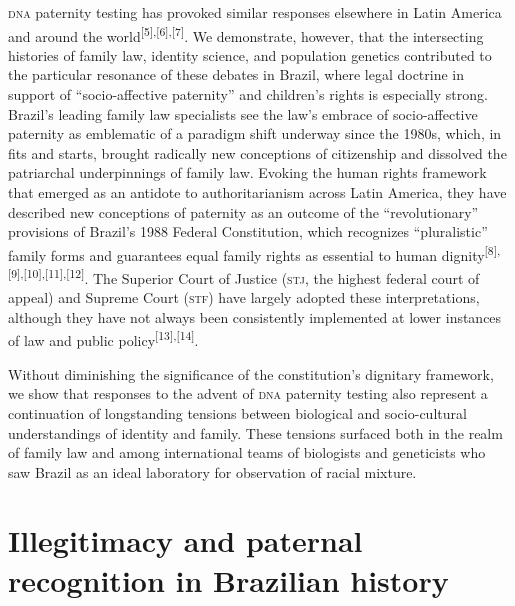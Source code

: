 \documentclass{article}
\begin{document}
\textsc{dna} paternity testing has provoked similar responses elsewhere in Latin America
and around the world\textsuperscript{[}\textsuperscript{5}\textsuperscript{]}\textsuperscript{,}\textsuperscript{[}\textsuperscript{6}\textsuperscript{]}\textsuperscript{,}\textsuperscript{[}\textsuperscript{7}\textsuperscript{]}. We demonstrate, however, that the intersecting histories of family law,
identity science, and population genetics contributed to the particular
resonance of these debates in Brazil, where legal doctrine in support of
“socio-affective paternity” and children’s rights is especially strong. Brazil’s
leading family law specialists see the law’s embrace of socio-affective
paternity as emblematic of a paradigm shift underway since the 1980s, which, in
fits and starts, brought radically new conceptions of citizenship and dissolved
the patriarchal underpinnings of family law. Evoking the human rights framework
that emerged as an antidote to authoritarianism across Latin America, they have
described new conceptions of paternity as an outcome of the “revolutionary”
provisions of Brazil’s 1988 Federal Constitution, which recognizes “pluralistic”
family forms and guarantees equal family rights as essential to human dignity\textsuperscript{[}\textsuperscript{8}\textsuperscript{]}\textsuperscript{,}\textsuperscript{[}\textsuperscript{9}\textsuperscript{]}\textsuperscript{,}\textsuperscript{[}\textsuperscript{10}\textsuperscript{]}\textsuperscript{,}\textsuperscript{[}\textsuperscript{11}\textsuperscript{]}\textsuperscript{,}\textsuperscript{[}\textsuperscript{12}\textsuperscript{]}. The Superior Court of Justice (\textsc{stj}, the highest federal court of appeal) and
Supreme Court (\textsc{stf}) have largely adopted these interpretations, although they
have not always been consistently implemented at lower instances of law and
public policy\textsuperscript{[}\textsuperscript{13}\textsuperscript{]}\textsuperscript{,}\textsuperscript{[}\textsuperscript{14}\textsuperscript{]}.

Without diminishing the significance of the constitution’s dignitary framework,
we show that responses to the advent of \textsc{dna} paternity testing also represent a
continuation of longstanding tensions between biological and socio-cultural
understandings of identity and family. These tensions surfaced both in the realm
of family law and among international teams of biologists and geneticists who
saw Brazil as an ideal laboratory for observation of racial mixture.

\section{Illegitimacy and paternal recognition in Brazilian history}
\end{document}
